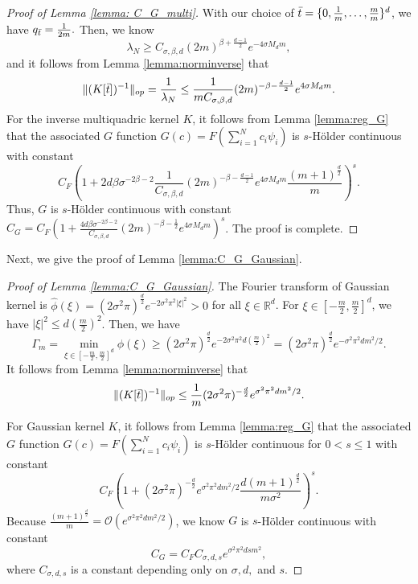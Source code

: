 \documentclass{article}
\def\RR{\mathbb R}
\numberwithin{equation}{section}
\begin{document}
\begin{appendices}
\begin{proof}[Proof of Lemma \ref{lemma: C_G_multi}]
With our choice of $\Bar{t}=\{ 0, \frac{1}{m},\ldots, \frac{m}{m}\}^d$, we have $q_{\Bar{t}}=\frac{1}{2m}.$
Then, we know
\begin{equation*}
    \lambda_N \geq C_{\sigma, \beta,d}(2m)^{\beta +\frac{d-1}{2}}e^{-4\sigma M_d m},
\end{equation*}
and it follows from Lemma \ref{lemma:norminverse} that 
\begin{equation}
    \|(K[\Bar{t}])^{-1}\|_{op} = \frac{1}{\lambda_{N}} \leq \frac{1}{mC_{\sigma, \beta,d}} (2m)^{-\beta -\frac{d-1}{2}}e^{4\sigma M_d m}.
\end{equation}
For the inverse multiquadric kernel $K$, it follows from Lemma \ref{lemma:reg_G} that the associated $G$ function  $G(c) = F\left(\sum_{i=1}^N c_i \psi_i\right)$ is $s$-H\"{o}lder continuous with constant 
$$C_F\left(1+ 2d\beta \sigma^{-2\beta-2}\frac{1}{C_{\sigma, \beta,d}}(2m)^{-\beta -\frac{d-1}{2}}e^{4\sigma M_d m}\frac{(m+1)^{\frac{d}{2}}}{m}\right)^s.$$ 
Thus, $G$ is  $s$-H\"{o}lder continuous with constant
$C_G = C_F\left(1+ \frac{4d\beta \sigma^{-2\beta-2}}{C_{\sigma, \beta,d}}(2m)^{-\beta -\frac{1}{2}}e^{4\sigma M_d m}\right)^s$.
The proof is complete. 
\end{proof}

Next, we give the proof of Lemma \ref{lemma:C_G_Gaussian}. 
\begin{proof}[Proof of Lemma \ref{lemma:C_G_Gaussian}]
The Fourier transform of Gaussian kernel is $\widehat{\phi}(\xi) = (2\sigma^2\pi)^{\frac{d}{2}}e^{-2\sigma^2\pi^2 |\xi|^2}> 0$ for all $\xi \in \RR^d$.  For $\xi \in [-\frac{m}{2},\frac{m}{2}]^d$, we have $|\xi|^2 \leq d\left(\frac{m}{2}\right)^2$. 
Then, we have 
\begin{equation*}
    \Gamma_m =  \min_{\xi \in [-\frac{m}{2},\frac{m}{2}]^d} \widehat{\phi}(\xi) 
    \geq (2\sigma^2\pi)^\frac{d}{2}e^{-2\sigma^2\pi^2 d\left(\frac{m}{2}\right)^2} = (2\sigma^2\pi)^\frac{d}{2}e^{-\sigma^2\pi^2 dm^2/2}.
\end{equation*}
It follows from Lemma \ref{lemma:norminverse} that
\begin{equation*}
    \|(K[\Bar{t}])^{-1}\|_{op} \leq \frac{1}{m}(2\sigma^2\pi)^{-\frac{d}{2}}e^{\sigma^2\pi^2 dm^2/2}.
\end{equation*}

For Gaussian kernel $K$, it follows from Lemma \ref{lemma:reg_G} that the associated $G$ function  $G(c) = F\left(\sum_{i=1}^N c_i \psi_i\right)$ is $s$-H\"{o}lder continuous for $0 < s \leq 1$ with constant 
\begin{equation*}
   C_F\left(1+(2\sigma^2\pi)^{-\frac{d}{2}}e^{\sigma^2\pi^2 dm^2/2}\frac{d(m+1)^{\frac{d}{2}}}{m\sigma^2}\right)^s. 
\end{equation*}
Because $\frac{(m+1)^{\frac{d}{2}}}{m} = \mathcal{O}(e^{\sigma^2\pi^2 dm^2/2})$, we know $G$ is $s$-H\"{o}lder continuous with constant
\begin{equation}
    C_G = C_FC_{\sigma,d,s}e^{\sigma^2\pi^2 dsm^2}, 
\end{equation}
where $C_{\sigma,d,s}$ is a constant depending only on $\sigma,d,$ and $s$.
\end{proof}





\end{appendices}
\end{document}
